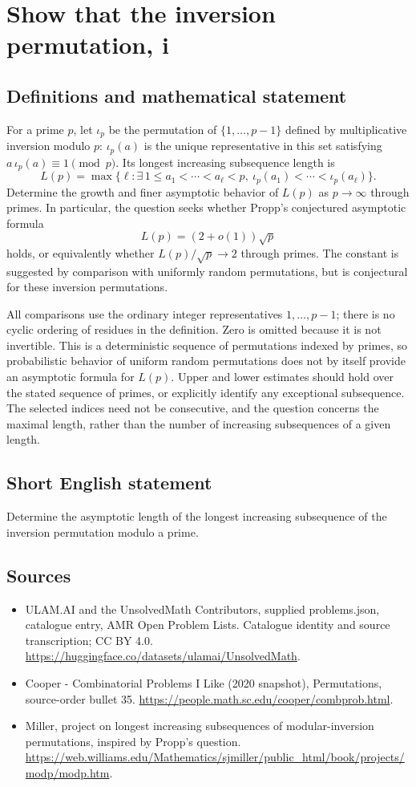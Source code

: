 \documentclass[11pt,a4paper]{article}
\begin{document}
\section*{Show that the inversion permutation, i}\label{statement}

\subsection{Definitions and mathematical statement}
For a prime $p$, let $\iota_p$ be the permutation of
$\{1,\ldots,p-1\}$ defined by multiplicative inversion modulo $p$:
$\iota_p(a)$ is the unique representative in this set satisfying
$a\,\iota_p(a)\equiv1\pmod p$. Its longest increasing subsequence
length is
\[
 L(p)=\max\{\ell:\exists\,1\le a_1<\cdots<a_\ell<p,
           \ \iota_p(a_1)<\cdots<\iota_p(a_\ell)\}.
\]
Determine the growth and finer asymptotic behavior of $L(p)$ as
$p\to\infty$ through primes. In particular, the question seeks
whether Propp's conjectured asymptotic formula
\[
                         L(p)=(2+o(1))\sqrt p
\]
holds, or equivalently whether $L(p)/\sqrt p\to2$ through primes.
The constant is suggested by comparison with uniformly random
permutations, but is conjectural for these inversion permutations.

All comparisons use the ordinary integer representatives
$1,\ldots,p-1$; there is no cyclic ordering of residues in the
definition. Zero is omitted because it is not invertible.
This is a deterministic sequence of permutations indexed by
primes, so probabilistic behavior of uniform random permutations
does not by itself provide an asymptotic formula for $L(p)$.
Upper and lower estimates should hold over the stated sequence of
primes, or explicitly identify any exceptional subsequence.
The selected indices need not be consecutive, and the question
concerns the maximal length, rather than the number of increasing
subsequences of a given length.
\subsection{Short English statement}
Determine the asymptotic length of the longest increasing subsequence of the inversion permutation modulo a prime.
\subsection{Sources}
\begin{itemize}
\item[S1] ULAM.AI and the UnsolvedMath Contributors, supplied problems.json, catalogue entry, AMR Open Problem Lists. Catalogue identity and source transcription; CC BY 4.0.
\url{https://huggingface.co/datasets/ulamai/UnsolvedMath}.
\item[S2] Cooper - Combinatorial Problems I Like (2020 snapshot), Permutations, source-order bullet 35. 
\url{https://people.math.sc.edu/cooper/combprob.html}.
\item[S3] Miller, project on longest increasing subsequences of modular-inversion permutations, inspired by Propp’s question.
\url{https://web.williams.edu/Mathematics/sjmiller/public_html/book/projects/modp/modp.htm}.
\end{itemize}
\end{document}
